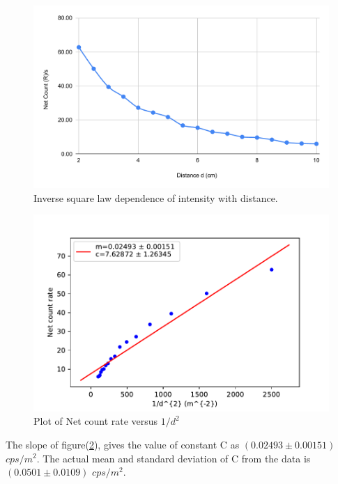 \documentclass[a4paper, amsfonts, amssymb, amsmath, reprint, showkeys, nofootinbib, twoside]{revtex4-1}
\begin{document}
\begin{figure}[H]
	\centering
	\includegraphics[scale=0.4]{i1}
	\caption{Inverse square law dependence of intensity with distance.}
	\label{i1}
\end{figure}

\begin{figure}[H]
	\centering
	\includegraphics[scale=0.5]{i2}
	\caption{Plot of Net count rate versus $1/d^2$}
	\label{i2}
\end{figure}

The slope of figure(\ref{i2}), gives the value of constant C as $(0.02493\pm0.00151) $ $cps/m^2$. The actual mean and standard deviation of C from the data is $(0.0501\pm0.0109)$ $cps/m^2$.
\end{document}
